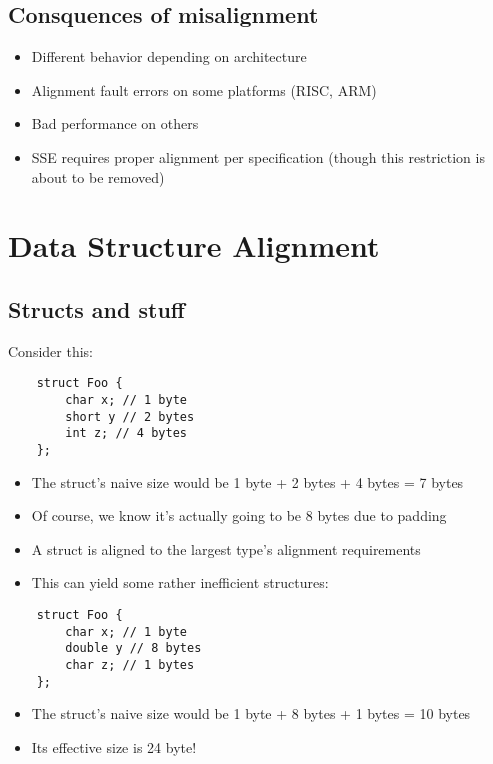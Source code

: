 \documentclass{beamer}
\begin{document}
\subsection{Consquences of misalignment}
\begin{frame}{\insertsection}{\insertsubsection}
	\begin{itemize}
		\item Different behavior depending on architecture
		\item Alignment fault errors on some platforms (RISC, ARM)
		\item Bad performance on others
		\item SSE requires proper alignment per specification (though this restriction is about to be removed)
	\end{itemize}
\end{frame}

\section{Data Structure Alignment}
\subsection{Structs and stuff}
\begin{frame}[fragile]{\insertsection}{\insertsubsection}
    Consider this:
    \begin{verbatim}
    struct Foo {
        char x; // 1 byte
        short y // 2 bytes
        int z; // 4 bytes
    };
    \end{verbatim}
    \begin{itemize}
        \item The struct's naive size would be 1 byte + 2 bytes + 4 bytes = 7 bytes\pause
        \item Of course, we know it's actually going to be 8 bytes due to padding
    \end{itemize}
\end{frame}

\begin{frame}[fragile]{\insertsection}{\insertsubsection}
    \begin{itemize}
        \item A struct is aligned to the largest type's alignment requirements\pause
        \item This can yield some rather inefficient structures:
    \end{itemize}
    \begin{verbatim}
    struct Foo {
        char x; // 1 byte
        double y // 8 bytes
        char z; // 1 bytes
    };
    \end{verbatim}
    \begin{itemize}
        \item The struct's naive size would be 1 byte + 8 bytes + 1 bytes = 10 bytes\pause
        \item Its effective size is 24 byte!
    \end{itemize}
\end{frame}
\end{document}
